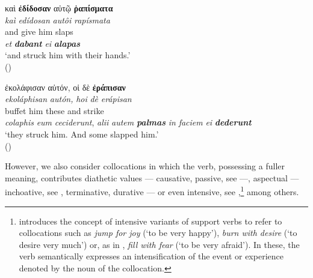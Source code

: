 \documentclass[output=paper,colorlinks,citecolor=brown]{langscibook}
\begin{document}
\z

\z

\ea\label{ex:bj:2}

\ea\label{ex:bj:2a}

\gllll καὶ \textbf{ἐδίδοσαν} αὐτῷ \textbf{ῥαπίσματα}\\
 \textit{kaì} \textit{edídosan} \textit{autôi} \textit{rapísmata}\\
and give him slaps\\
\emph{et} \textbf{\itshape dabant} \emph{ei} \textbf{\itshape alapas}\\
\glt `and struck him with their hands.' \\
\hspace*{\fill}() \\

\ex\label{ex:bj:2b}

\gllll ἐκολάφισαν αὐτόν, οἱ δὲ \textbf{ἐράπισαν}\\
 \textit{ekoláphisan} \textit{autón,} \textit{hoi} \textit{dè} \textit{erápisan}\\
buffet him these and strike\\
\emph{colaphis} {\emph{eum} \emph{ceciderunt}}, \emph{alii} \emph{autem} {\textbf{\itshape
    palmas} \emph{in} \emph{faciem} \emph{ei} \textbf{\itshape dederunt}}\\
\glt `they struck him. And some slapped him.' \\
\hspace*{\fill}() \\

\z

\z

However, we also consider collocations in which the verb, possessing a fuller meaning,
contributes diathetic values  --- causative, passive, see  ---, aspectual
 --- inchoative, see , terminative, durative ---  or even intensive, see
,\footnote{\citet[34]{Gross1998} introduces the concept of intensive
  variants of support verbs to refer to collocations such as \emph{jump for joy} (`to be
  very happy'), \emph{burn with desire} (`to desire very much') or, as in ,
  \emph{fill with fear} (`to be very afraid'). In these, the verb semantically expresses
  an intensification of the event or experience denoted by the noun of the collocation.}
among others.

\end{document}

